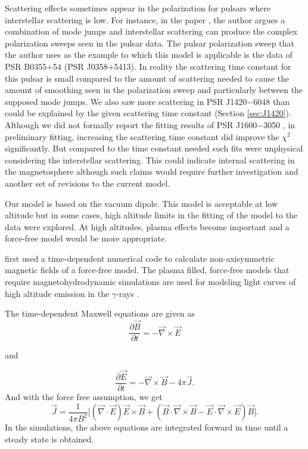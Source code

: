 Scattering effects sometimes appear in the polarization
for pulsars where interstellar scattering is low.
For instance, in the paper \cite{karastergiou2009complex},
the author argues a combination of mode
jumps and interstellar scattering
can produce the complex polarization sweeps seen in 
the pulsar data.
The pulsar polarization sweep that the author uses as the
example to which this model is applicable is the data of
PSR B0355$+$54 (PSR J0358$+$5413).
In reality the scattering time constant for 
this pulsar is small compared to the
amount of scattering needed to 
cause the amount of smoothing seen in
the polarization sweep and particularly
between the supposed mode jumps.
We also saw more scattering in PSR J1420$-$6048
than could be explained by the given scattering
time constant (Section \ref{sec:J1420}).
Although we did not formally report the
fitting results of PSR J1600$-$3050 \citep{yan2011polarization},
in preliminary fitting, increasing the scattering time
constant did improve the $\chi^2$ significantly. But
compared to the time constant needed \citep{cordes2002ne2001} 
such fits were unphysical considering the interstellar scattering.
This could indicate internal scattering in the magnetosphere
\citep{braje2001magnetospheric} although such claims would require further investigation
and another set of revisions to the current model.

Our model is based on the vacuum dipole.  This model
is acceptable at low altitude but in some cases,
high altitude limits in the fitting of the
model to the data were explored.  At high altitudes, plasma effects 
become important and a force-free model would be
more appropriate.  

\cite{spitkovsky2006time} first used a time-dependent
numerical code to calculate non-axisymmetric
magnetic fields of a force-free model.
The plasma filled, force-free models that require magnetohydrodynamic
simulations are used for modeling light curves of
high altitude emission in the $\gamma$-rays
\citep{contopoulos2010pulsar,bai2010modeling}.

The time-dependent Maxwell equations are given as
\begin{equation}
\frac{\partial \vec{B}}{\partial t}=-\vec{\nabla} \times \vec{E} 
\end{equation}
\begin{center}
and
\end{center}
\begin{equation}
\frac{\partial \vec{E}}{\partial t}=-\vec{\nabla} \times \vec{B} - 4\pi \vec{J}. 
\end{equation}
And with the force free assumption, we get
\begin{equation}
\vec{J}=\frac{1}{4\pi B^2} \lbrack (\vec{\nabla}\cdot\vec{E}) \vec{E}\times\vec{B} + (\vec{B}\cdot\vec{\nabla}\times\vec{B}-\vec{E}\cdot\vec{\nabla}\times\vec{E})\vec{B}  \rbrack
.
\end{equation}
In the simulations, the above equations are integrated forward in time
\citep{yee1966numerical}
until a steady state is obtained.

